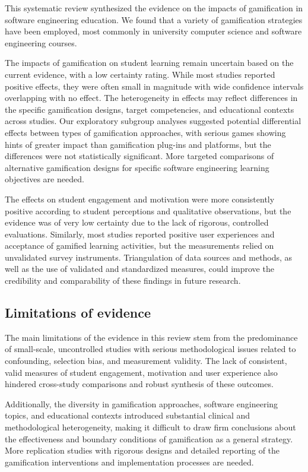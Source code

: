 \documentclass[
	hf,
	]{ceurart}
\begin{document}
		This systematic review synthesized the evidence on the impacts of gamification in software engineering education. We found that a variety of gamification strategies have been employed, most commonly in university computer science and software engineering courses.
		
		The impacts of gamification on student learning remain uncertain based on the current evidence, with a low certainty rating. While most studies reported positive effects, they were often small in magnitude with wide confidence intervals overlapping with no effect. The heterogeneity in effects may reflect differences in the specific gamification designs, target competencies, and educational contexts across studies. Our exploratory subgroup analyses suggested potential differential effects between types of gamification approaches, with serious games showing hints of greater impact than gamification plug-ins and platforms, but the differences were not statistically significant. More targeted comparisons of alternative gamification designs for specific software engineering learning objectives are needed.
		
		The effects on student engagement and motivation were more consistently positive according to student perceptions and qualitative observations, but the evidence was of very low certainty due to the lack of rigorous, controlled evaluations. Similarly, most studies reported positive user experiences and acceptance of gamified learning activities, but the measurements relied on unvalidated survey instruments. Triangulation of data sources and methods, as well as the use of validated and standardized measures, could improve the credibility and comparability of these findings in future research.
		
		\subsection{Limitations of evidence}
		The main limitations of the evidence in this review stem from the predominance of small-scale, uncontrolled studies with serious methodological issues related to confounding, selection bias, and measurement validity. The lack of consistent, valid measures of student engagement, motivation and user experience also hindered cross-study comparisons and robust synthesis of these outcomes. 
		
		Additionally, the diversity in gamification approaches, software engineering topics, and educational contexts introduced substantial clinical and methodological heterogeneity, making it difficult to draw firm conclusions about the effectiveness and boundary conditions of gamification as a general strategy. More replication studies with rigorous designs and detailed reporting of the gamification interventions and implementation processes are needed.
		
\end{document}
